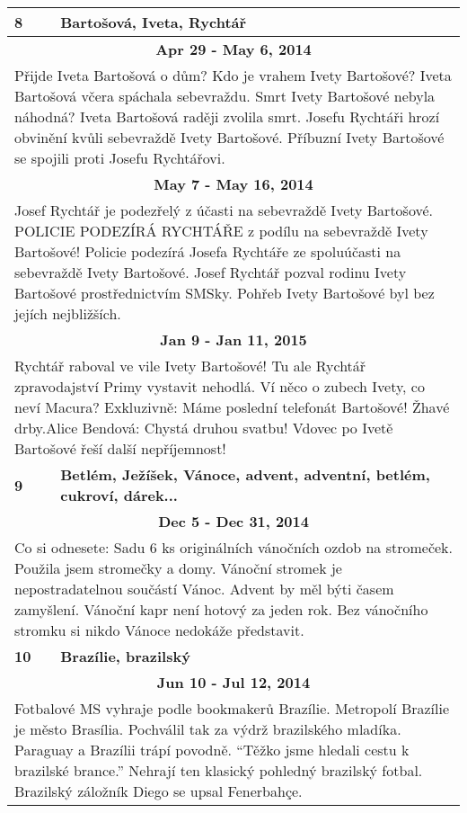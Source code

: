 \begin{tabularx}{\linewidth}{l l}
\bf 8 & \bf Bartošová, Iveta, Rychtář \\ \midrule
\multicolumn{2}{c}{\bf Apr 29 - May 6, 2014} \\
\multicolumn{2}{p{\linewidth}}{Přijde Iveta Bartošová o dům? Kdo je vrahem Ivety Bartošové? Iveta Bartošová včera spáchala sebevraždu. Smrt Ivety Bartošové nebyla náhodná? Iveta Bartošová raději zvolila smrt. Josefu Rychtáři hrozí obvinění kvůli sebevraždě Ivety Bartošové. Příbuzní Ivety Bartošové se spojili proti Josefu Rychtářovi.} \\ \midrule
\multicolumn{2}{c}{\bf May 7 - May 16, 2014} \\
\multicolumn{2}{p{\linewidth}}{Josef Rychtář je podezřelý z účasti na sebevraždě Ivety Bartošové. POLICIE PODEZÍRÁ RYCHTÁŘE z podílu na sebevraždě Ivety Bartošové! Policie podezírá Josefa Rychtáře ze spoluúčasti na sebevraždě Ivety Bartošové. Josef Rychtář pozval rodinu Ivety Bartošové prostřednictvím SMSky. Pohřeb Ivety Bartošové byl bez jejích nejbližších.} \\ \midrule
\multicolumn{2}{c}{\bf Jan 9 - Jan 11, 2015} \\
\multicolumn{2}{p{\linewidth}}{Rychtář raboval ve vile Ivety Bartošové! Tu ale Rychtář zpravodajství Primy vystavit nehodlá. Ví něco o zubech Ivety, co neví Macura? Exkluzivně: Máme poslední telefonát Bartošové! Žhavé drby.Alice Bendová: Chystá druhou svatbu! Vdovec po Ivetě Bartošové řeší další nepříjemnost!} \\ \midrule[1.5pt]

\bf 9 & \bf Betlém, Ježíšek, Vánoce, advent, adventní, betlém, cukroví, dárek... \\ \midrule
\multicolumn{2}{c}{\bf Dec 5 - Dec 31, 2014} \\
\multicolumn{2}{p{\linewidth}}{Co si odnesete: Sadu 6 ks originálních vánočních ozdob na stromeček. Použila jsem stromečky a domy. Vánoční stromek je nepostradatelnou součástí Vánoc. Advent by měl býti časem zamyšlení. Vánoční kapr není hotový za jeden rok. Bez vánočního stromku si nikdo Vánoce nedokáže představit.} \\ \midrule[1.5pt]

\bf 10 & \bf Brazílie, brazilský \\ \midrule
\multicolumn{2}{c}{\bf Jun 10 - Jul 12, 2014} \\
\multicolumn{2}{p{\linewidth}}{Fotbalové MS vyhraje podle bookmakerů Brazílie. Metropolí Brazílie je město Brasília. Pochválil tak za výdrž brazilského mladíka. Paraguay a Brazílii trápí povodně. ``Těžko jsme hledali cestu k brazilské brance.'' Nehrají ten klasický pohledný brazilský fotbal. Brazilský záložník Diego se upsal Fenerbahçe.} \\ \midrule[1.5pt]


\end{tabularx}
